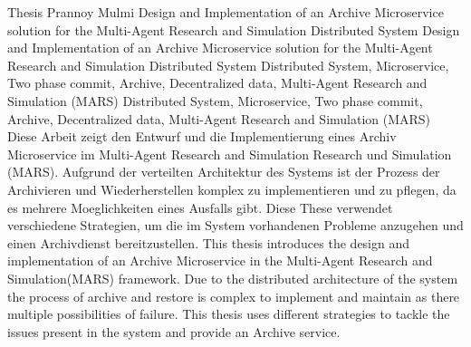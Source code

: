 													{ Thesis }																			%
													{Prannoy Mulmi}														%
													{Design and Implementation of an Archive Microservice solution for the Multi-Agent Research and
													Simulation Distributed System}											  %
													{Design and Implementation of an Archive Microservice solution for the Multi-Agent Research and
													Simulation Distributed System}							%
													{Distributed System, Microservice, Two phase commit, Archive, Decentralized data, Multi-Agent Research and Simulation (MARS)}																		%
													{Distributed System, Microservice, Two phase commit, Archive, Decentralized data, Multi-Agent Research and Simulation (MARS)}																			%
													{Diese Arbeit zeigt den Entwurf und die Implementierung eines Archiv Microservice im Multi-Agent Research and Simulation
													Research und Simulation (MARS). Aufgrund der verteilten Architektur des Systems ist der Prozess der
													Archivieren und Wiederherstellen komplex zu implementieren und zu pflegen, da es mehrere Moeglichkeiten eines Ausfalls gibt. Diese These
													verwendet verschiedene Strategien, um die im System vorhandenen Probleme anzugehen und einen Archivdienst bereitzustellen.}	
													{This thesis introduces the design and implementation of an Archive Microservice in the Multi-Agent
													Research and Simulation(MARS) framework. Due to the distributed architecture of the system the process of
													archive and restore is complex to implement and maintain as there multiple possibilities of failure. This thesis
													uses different strategies to tackle the issues present in the system and provide an Archive service.}	

												
  									  													


	  																							

